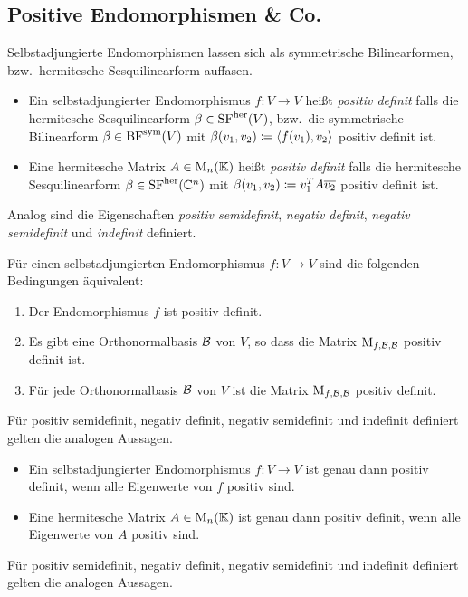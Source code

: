 


\subsection{Positive Endomorphismen \& Co.}

Selbstadjungierte Endomorphismen lassen sich als symmetrische Bilinearformen, bzw.\ hermitesche Sesquilinearform auffasen.

\begin{definition}
  \leavevmode
  \begin{itemize}
    \item
      Ein selbstadjungierter Endomorphismus $f \colon V \to V$ heißt \emph{positiv definit} falls die hermitesche Sesquilinearform $\beta \in \operatorname{SF}^{\operatorname{her}}(V)$, bzw.\ die symmetrische Bilinearform $\beta \in \operatorname{BF}^{\operatorname{sym}}(V)$ mit $\beta(v_1, v_2) \coloneqq \left\langle f(v_1), v_2 \right\rangle$ positiv definit ist.
    \item
      Eine hermitesche Matrix $A \in \operatorname{M}_{n}(\mathbb{K})$ heißt \emph{positiv definit} falls die hermitesche Sesquilinearform $\beta \in \operatorname{SF}^{\operatorname{her}}(\mathbb{C}^n)$ mit $\beta(v_1, v_2) \coloneqq v_1^T A \overline{v_2}$ positiv definit ist.
  \end{itemize}
  
  Analog sind die Eigenschaften \emph{positiv semidefinit}, \emph{negativ definit}, \emph{negativ semidefinit} und \emph{indefinit} definiert.
\end{definition}

\begin{definition}
  Für einen selbstadjungierten Endomorphismus $f \colon V \to V$ sind die folgenden Bedingungen äquivalent:
  \begin{enumerate}
    \item
      Der Endomorphismus $f$ ist positiv definit.
    \item
      Es gibt eine Orthonormalbasis $\mathcal{B}$ von $V$, so dass die Matrix $\operatorname{M}_{f, \mathcal{B}, \mathcal{B}}$ positiv definit ist.
    \item
      Für jede Orthonormalbasis $\mathcal{B}$ von $V$ ist die Matrix $\operatorname{M}_{f, \mathcal{B}, \mathcal{B}}$ positiv definit.
  \end{enumerate}
  Für positiv semidefinit, negativ definit, negativ semidefinit und indefinit definiert gelten die analogen Aussagen.
\end{definition}

\begin{corollary}
  \leavevmode
  \begin{itemize}
    \item
      Ein selbstadjungierter Endomorphismus $f \colon V \to V$ ist genau dann positiv definit, wenn alle Eigenwerte von $f$ positiv sind.
    \item
      Eine hermitesche Matrix $A \in \operatorname{M}_{n}(\mathbb{K})$ ist genau dann positiv definit, wenn alle Eigenwerte von $A$ positiv sind.
  \end{itemize}
  Für positiv semidefinit, negativ definit, negativ semidefinit und indefinit definiert gelten die analogen Aussagen.
\end{corollary}





